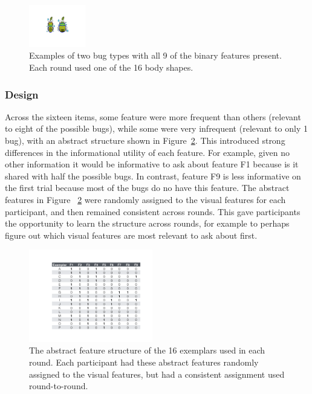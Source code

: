 \documentclass[10pt,letterpaper]{article}
\begin{document}
\begin{figure}[h]
  \centering
  \includegraphics[width=0.22\textwidth]{figures/example_bugs}
  \caption{Examples of two bug types with all 9 of the binary features present. Each round used one of the 16 
body shapes. } %
  \label{fig:example_bugs}
\end{figure} 

\subsubsection{Design}

Across the sixteen items, some feature were more frequent than others (relevant to eight of the possible
bugs), while some were very infrequent (relevant to only 1 bug), with an
abstract structure shown in Figure~\ref{fig:feature_table}. This introduced
strong differences in the informational utility of each feature.  For example,
given no other information it would be informative to ask about feature F1
because is it shared with half the possible bugs.  In contrast, feature
F9 is less informative on the first trial because most of the bugs do no have this
feature. The abstract features in Figure~
\ref{fig:feature_table} were randomly assigned to the visual features for each 
participant, and then remained consistent across rounds. This gave participants the 
opportunity to learn the structure across rounds, for example to perhaps figure out 
which visual features are most relevant to ask about first.

\begin{figure}[h]
  \centering
  \includegraphics[width=0.48\textwidth]{figures/feature_table}
  \caption{The abstract feature structure of the 16 exemplars used in each round. 
Each participant had these abstract features randomly assigned to the visual 
features, but had a consistent assignment used round-to-round.}
  \label{fig:feature_table}
\end{figure} 
\end{document}
